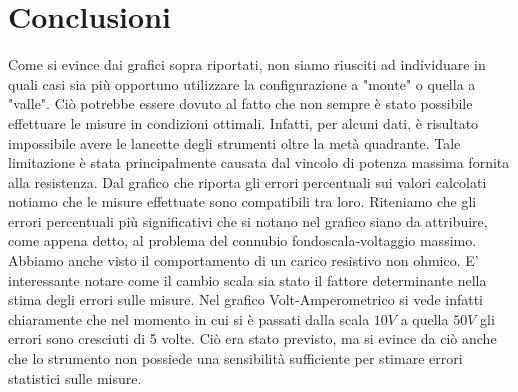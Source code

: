 \section{Conclusioni}
Come si evince dai grafici sopra riportati, non siamo riusciti ad individuare in quali casi sia più opportuno utilizzare la configurazione a "monte" o quella a "valle". Ciò potrebbe essere dovuto al fatto che non sempre è stato possibile effettuare le misure in condizioni ottimali. Infatti, per alcuni dati, è risultato impossibile avere le lancette degli strumenti oltre la metà quadrante. Tale limitazione è stata principalmente causata dal vincolo di potenza massima fornita alla resistenza. Dal grafico che riporta gli errori percentuali sui valori calcolati notiamo che le misure effettuate sono compatibili tra loro. Riteniamo che gli errori percentuali più significativi che si notano nel grafico siano da attribuire, come appena detto, al problema del connubio fondoscala-voltaggio massimo. Abbiamo anche visto il comportamento di un carico resistivo non ohmico. E' interessante notare come il cambio scala sia stato il fattore determinante nella stima degli errori sulle misure. Nel grafico Volt-Amperometrico si vede infatti chiaramente che nel momento in cui si è passati dalla scala $10V$ a quella $50V$ gli errori sono cresciuti di 5 volte. Ciò era stato previsto, ma si evince da ciò anche che lo strumento non possiede una sensibilità sufficiente per stimare errori statistici sulle misure.